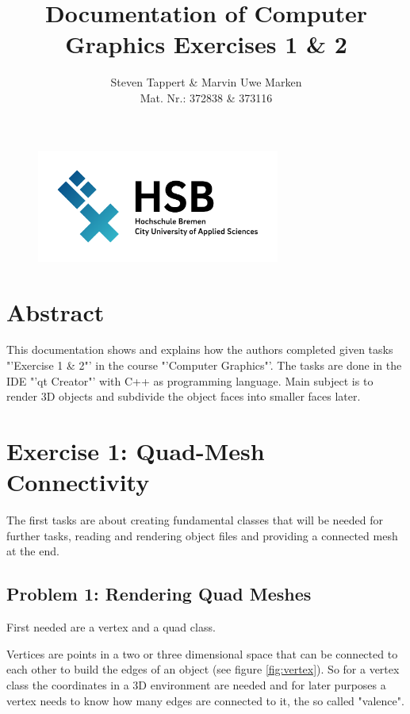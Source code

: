 \documentclass[11.5pt,oneside,a4paper]{scrartcl}
\title{Documentation of Computer Graphics Exercises 1 \& 2}
\author{Steven Tappert \& Marvin Uwe Marken\\\small{Mat. Nr.: 372838 \& 373116}}
\date{}
\newcounter{ct}
\begin{document}
\clearpage
{\let\newpage\relax\maketitle}
\thispagestyle{empty}
\vspace{20pt}

\begin{figure}
	\centering
	\includegraphics[width=8cm]{hsb.png} \\
\end{figure}

\newpage
\tableofcontents
\newpage

\section{Abstract}
This documentation shows and explains how the authors completed given tasks "'Exercise 1 \& 2"' in the course "'Computer Graphics"'. The tasks are done in the IDE "'qt Creator"' with C++ as programming language. Main subject is to render 3D objects and subdivide the object faces into smaller faces later.

\section{Exercise 1: Quad-Mesh Connectivity}

The first tasks are about creating fundamental classes that will be needed for further tasks, reading and rendering object files and providing a connected mesh at the end.


\subsection{Problem 1: Rendering Quad Meshes}

First needed are a vertex and a quad class.

Vertices are points in a two or three dimensional space that can be connected to each other to build the edges of an object (see figure \ref{fig:vertex}). So for a vertex class the coordinates in a 3D environment are needed and for later purposes a vertex needs to know how many edges are connected to it, the so called "valence".
\end{document}
